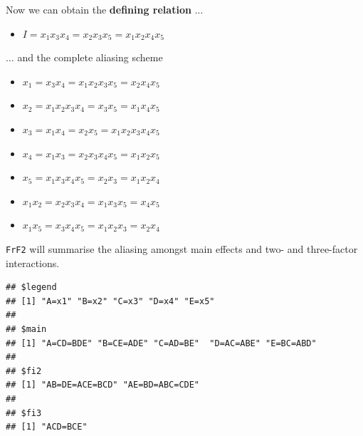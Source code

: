 \documentclass[
  ignorenonframetext,
]{beamer}
\newenvironment{Shaded}{\begin{snugshade}}{\end{snugshade}}
\newcommand{\FunctionTok}[1]{\textcolor[rgb]{0.00,0.00,0.00}{#1}}
\newcommand{\NormalTok}[1]{#1}
\newcommand{\SpecialCharTok}[1]{\textcolor[rgb]{0.00,0.00,0.00}{#1}}
\providecommand{\tightlist}{%
  \setlength{\itemsep}{0pt}\setlength{\parskip}{0pt}}
\begin{document}
\begin{frame}{}
\protect\hypertarget{section-12}{}
Now we can obtain the \textbf{defining relation} \(\ldots\)

\begin{itemize}
\tightlist
\item
  \(I = x_1x_3x_4 = x_2x_3x_5 = x_1x_2x_4x_5\)
\end{itemize}

\(\ldots\) and the complete aliasing scheme

\begin{itemize}
\tightlist
\item
  \(x_1 = x_3x_4 = x_1x_2x_3x_5 = x_2x_4x_5\)
\item
  \(x_2 = x_1x_2x_3x_4 = x_3x_5 = x_1x_4x_5\)
\item
  \(x_3 = x_1x_4 = x_2x_5 = x_1x_2x_3x_4x_5\)
\item
  \(x_4 = x_1x_3 = x_2x_3x_4x_5 = x_1x_2x_5\)
\item
  \(x_5 = x_1x_3x_4x_5 = x_2x_3 = x_1x_2x_4\)
\item
  \(x_1x_2 = x_2x_3x_4 = x_1x_3x_5 = x_4x_5\)
\item
  \(x_1x_5 = x_3x_4x_5 = x_1x_2x_3 = x_2x_4\)
\end{itemize}
\end{frame}

\begin{frame}[fragile]{}
\protect\hypertarget{section-13}{}
\texttt{FrF2} will summarise the aliasing amongst main effects and two-
and three-factor interactions.

\begin{Shaded}
\end{Shaded}

\begin{verbatim}
## $legend
## [1] "A=x1" "B=x2" "C=x3" "D=x4" "E=x5"
## 
## $main
## [1] "A=CD=BDE" "B=CE=ADE" "C=AD=BE"  "D=AC=ABE" "E=BC=ABD"
## 
## $fi2
## [1] "AB=DE=ACE=BCD" "AE=BD=ABC=CDE"
## 
## $fi3
## [1] "ACD=BCE"
\end{verbatim}
\end{frame}
\end{document}
